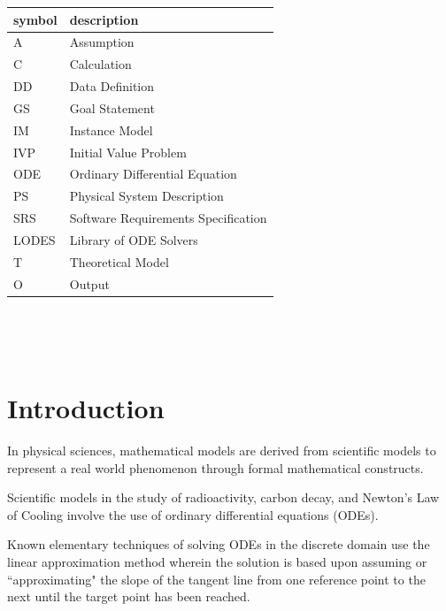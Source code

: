 \documentclass[12pt]{article}
\newcommand{\famname}{LODES} %
\newcommand{\famdesc}{Library of ODE Solvers}
\begin{document}
\renewcommand{\arraystretch}{1.2}
\begin{tabular}{l l} 
  \toprule		
  \textbf{symbol} & \textbf{description}\\
  \midrule 
  A & Assumption\\
  C & Calculation\\
  DD & Data Definition\\
  GS & Goal Statement\\
  IM & Instance Model\\
  IVP & Initial Value Problem\\
  ODE & Ordinary Differential Equation\\
  PS & Physical System Description\\
  SRS & Software Requirements Specification\\
  \famname{} & \famdesc{}\\
  T & Theoretical Model\\
  O & Output\\
  \bottomrule
\end{tabular}\\

\newpage

\tableofcontents

~\newpage


\section{Introduction}


In physical sciences, mathematical models are derived from scientific models to
represent a real world phenomenon through formal mathematical constructs.

Scientific models in the study of radioactivity, carbon decay, and Newton's Law of Cooling
involve the use of ordinary differential equations (ODEs).

Known elementary techniques of solving ODEs in the discrete domain use the linear approximation
method wherein the solution is based upon assuming or ``approximating" the slope of the tangent
line from one reference point to the next until the target point has been reached.
\end{document}
